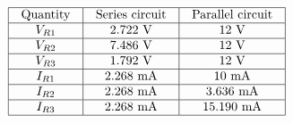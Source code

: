 $$\vbox{\offinterlineskip
\halign{\strut
\vrule \quad\hfil # \ \hfil & 
\vrule \quad\hfil # \ \hfil & 
\vrule \quad\hfil # \ \hfil \vrule \cr
\noalign{\hrule}
%
Quantity & Series circuit & Parallel circuit \cr
%
\noalign{\hrule}
%
$V_{R1}$ & 2.722 V & 12 V \cr
%
\noalign{\hrule}
%
$V_{R2}$ & 7.486 V & 12 V \cr
%
\noalign{\hrule}
%
$V_{R3}$ & 1.792 V & 12 V \cr
%
\noalign{\hrule}
%
$I_{R1}$ & 2.268 mA & 10 mA \cr
%
\noalign{\hrule}
%
$I_{R2}$ & 2.268 mA & 3.636 mA \cr
%
\noalign{\hrule}
%
$I_{R3}$ & 2.268 mA & 15.190 mA \cr
%
\noalign{\hrule}
} %
}$$ %












